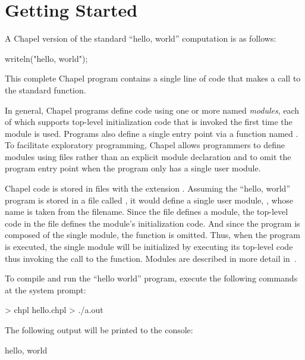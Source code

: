 \section{Getting Started}

A Chapel version of the standard ``hello, world'' computation is as
follows:
\vspace{0.5pc}
\begin{chapel}
writeln("hello, world");
\end{chapel}
This complete Chapel program contains a single line of code that makes
a call to the standard  function.


In general, Chapel programs define code using one or more named
\emph{modules}, each of which supports top-level initialization code
that is invoked the first time the module is used.  Programs also
define a single entry point via a function named .  To
facilitate exploratory programming, Chapel allows programmers to
define modules using files rather than an explicit module declaration
and to omit the program entry point when the program only has a single
user module.

Chapel code is stored in files with the extension .
Assuming the ``hello, world'' program is stored in a file
called , it would define a single user
module, , whose name is taken from the filename.  Since
the file defines a module, the top-level code in the file defines the
module's initialization code.  And since the program is composed of
the single  module, the  function is omitted.
Thus, when the program is executed, the single  module
will be initialized by executing its top-level code thus invoking the
call to the  function.  Modules are described in more
detail in~.

To compile and run the ``hello world'' program, execute the following
commands at the system prompt:
\begin{commandline} 
> chpl hello.chpl
> ./a.out
\end{commandline}
The following output will be printed to the console:
\begin{commandline}
hello, world
\end{commandline}
